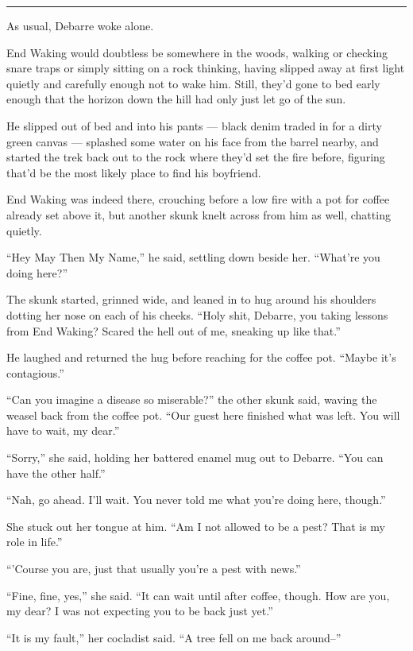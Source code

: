 \begin{center}\rule{0.5\linewidth}{0.5pt}\end{center}

As usual, Debarre woke alone.

End Waking would doubtless be somewhere in the woods, walking or checking snare traps or simply sitting on a rock thinking, having slipped away at first light quietly and carefully enough not to wake him. Still, they'd gone to bed early enough that the horizon down the hill had only just let go of the sun.

He slipped out of bed and into his pants — black denim traded in for a dirty green canvas — splashed some water on his face from the barrel nearby, and started the trek back out to the rock where they'd set the fire before, figuring that'd be the most likely place to find his boyfriend.

End Waking was indeed there, crouching before a low fire with a pot for coffee already set above it, but another skunk knelt across from him as well, chatting quietly.

``Hey May Then My Name,'' he said, settling down beside her. ``What're you doing here?''

The skunk started, grinned wide, and leaned in to hug around his shoulders dotting her nose on each of his cheeks. ``Holy shit, Debarre, you taking lessons from End Waking? Scared the hell out of me, sneaking up like that.''

He laughed and returned the hug before reaching for the coffee pot. ``Maybe it's contagious.''

``Can you imagine a disease so miserable?'' the other skunk said, waving the weasel back from the coffee pot. ``Our guest here finished what was left. You will have to wait, my dear.''

``Sorry,'' she said, holding her battered enamel mug out to Debarre. ``You can have the other half.''

``Nah, go ahead. I'll wait. You never told me what you're doing here, though.''

She stuck out her tongue at him. ``Am I not allowed to be a pest? That is my role in life.''

``'Course you are, just that usually you're a pest with news.''

``Fine, fine, yes,'' she said. ``It can wait until after coffee, though. How are you, my dear? I was not expecting you to be back just yet.''

``It is my fault,'' her cocladist said. ``A tree fell on me back around--''

